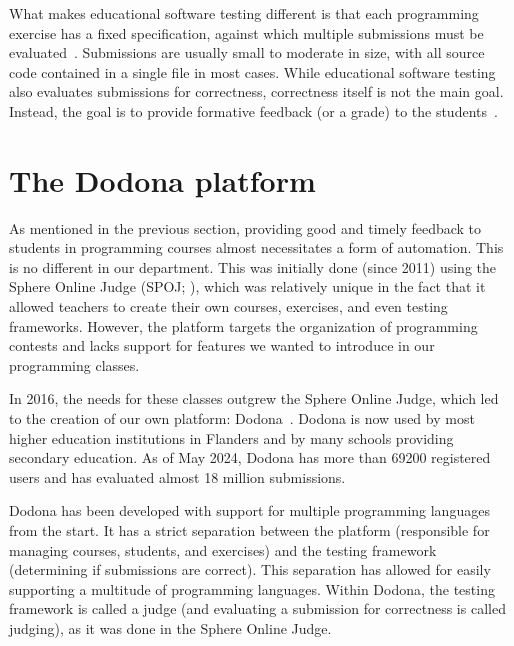 \documentclass[../main]{subfiles}
\begin{document}
What makes educational software testing different is that each programming exercise has a fixed specification, against which multiple submissions must be evaluated~\autocite{wilcoxTestingStrategiesAutomated2016}.
Submissions are usually small to moderate in size, with all source code contained in a single file in most cases.
While educational software testing also evaluates submissions for correctness, correctness itself is not the main goal.
Instead, the goal is to provide formative feedback (or a grade) to the students~\autocite{caizaProgrammingAssignmentsAutomatic2013}.

\section{The Dodona platform}\label{sec:dodona}

As mentioned in the previous section, providing good and timely feedback to students in programming courses almost necessitates a form of automation.
This is no different in our department.
This was initially done (since 2011) using the Sphere Online Judge (SPOJ; \cite{kosowskiApplicationOnlineJudge2008}), which was relatively unique in the fact that it allowed teachers to create their own courses, exercises, and even testing frameworks.
However, the platform targets the organization of programming contests and lacks support for features we wanted to introduce in our programming classes.

In 2016, the needs for these classes outgrew the Sphere Online Judge, which led to the creation of our own platform: Dodona~\autocite{vanpetegemDodonaLearnCode2023}.
Dodona is now used by most higher education institutions in Flanders and by many schools providing secondary education.
As of May 2024, Dodona has more than \num{69200} registered users and has evaluated almost 18 million submissions.

Dodona has been developed with support for multiple programming languages from the start.
It has a strict separation between the platform (responsible for managing courses, students, and exercises) and the testing framework (determining if submissions are correct).
This separation has allowed for easily supporting a multitude of programming languages.
Within Dodona, the testing framework is called a judge (and evaluating a submission for correctness is called judging), as it was done in the Sphere Online Judge.
\end{document}
